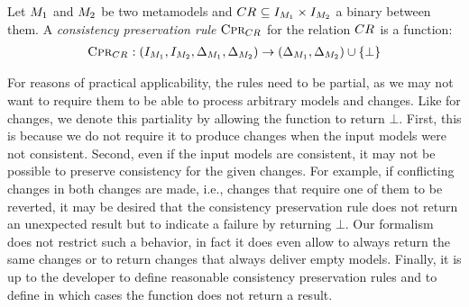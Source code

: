 \begin{definition}
    \label{def:consistencypreservationrule}
    Let $\metamodel{M}{1}$ and $\metamodel{M}{2}$ be two metamodels and $\consistencyrelation{CR}{} \subseteq \metamodelinstanceset{M}{1} \times \metamodelinstanceset{M}{2}$ a binary \modellevelconsistencyrelation between them.
    A \emph{consistency preservation rule} $\consistencypreservationrule{\consistencyrelation{CR}{}}$ for the relation $\consistencyrelation{CR}{}$ is a function:
    \begin{align*}
        \consistencypreservationrule{\consistencyrelation{CR}{}} : (\metamodelinstanceset{M}{1}, \metamodelinstanceset{M}{2}, \changeuniverse{\metamodel{M}{1}}, \changeuniverse{\metamodel{M}{2}}) \rightarrow (\changeuniverse{\metamodel{M}{1}}, \changeuniverse{\metamodel{M}{2}}) \cup \setted{\bot}
    \end{align*}
\end{definition}

For reasons of practical applicability, the rules need to be partial, as we may not want to require them to be able to process arbitrary models and changes.
Like for changes, we denote this partiality by allowing the function to return $\bot$.
First, this is because we do not require it to produce changes when the input models were not consistent.
Second, even if the input models are consistent, it may not be possible to preserve consistency for the given changes.
For example, if conflicting changes in both changes are made, i.e., changes that require one of them to be reverted, it may be desired that the consistency preservation rule does not return an unexpected result but to indicate a failure by returning $\bot$.
Our formalism does not restrict such a behavior, in fact it does even allow to always return the same changes or to return changes that always deliver empty models.
Finally, it is up to the developer to define reasonable consistency preservation rules and to define in which cases the function does not return a result.

